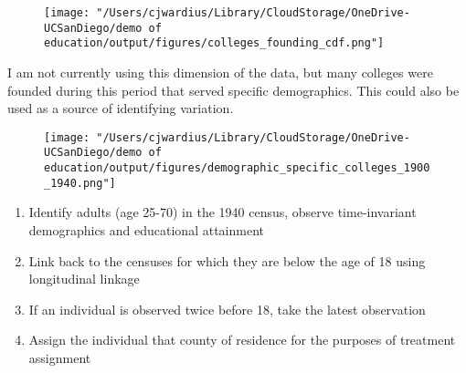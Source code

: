 \documentclass[notes,11pt, aspectratio=169]{beamer}
\begin{document}
\begin{frame}{\color{orange}{New college founding dates}}
  \begin{figure}
        \centering
        \texttt{[image: "/Users/cjwardius/Library/CloudStorage/OneDrive-UCSanDiego/demo of education/output/figures/colleges\_founding\_cdf.png"]}
    \end{figure}
\end{frame}


\begin{frame}{\color{orange}{Colleges specific to certain demographics}}
  \small I am not currently using this dimension of the data, but many colleges were founded during this period that served specific demographics. This could also be used as a source of identifying variation.
  \begin{figure}
        \centering
        \texttt{[image: "/Users/cjwardius/Library/CloudStorage/OneDrive-UCSanDiego/demo of education/output/figures/demographic\_specific\_colleges\_1900\_1940.png"]}
    \end{figure}
\end{frame}


\begin{frame}{\color{ForestGreen}{Determining whether an individual lived near a college founding}}
  \begin{enumerate}
    \item Identify adults (age 25-70) in the 1940 census, observe time-invariant demographics and educational attainment
    \item Link back to the censuses for which they are below the age of 18 using \cite{rugglesIPUMSUSAVersion2025} longitudinal linkage
    \item If an individual is observed twice before 18, take the latest observation
    \item Assign the individual that county of residence for the purposes of treatment assignment 
  \end{enumerate}
\end{frame}

\begin{frame}{\color{ForestGreen}{Comparing linked versus unlinked individuals in the census}}
  
\end{frame}
\end{document}

